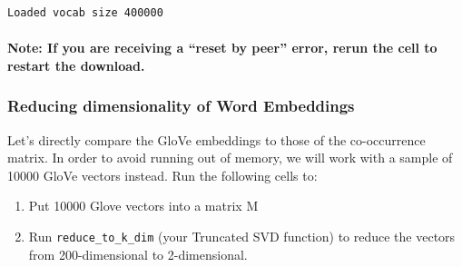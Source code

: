 \documentclass[11pt]{article}
\providecommand{\tightlist}{%
      \setlength{\itemsep}{0pt}\setlength{\parskip}{0pt}}
\begin{document}
    \begin{Verbatim}[commandchars=\\\{\}]
Loaded vocab size 400000
    \end{Verbatim}

    \hypertarget{note-if-you-are-receiving-a-reset-by-peer-error-rerun-the-cell-to-restart-the-download.}{%
\paragraph{Note: If you are receiving a ``reset by peer'' error, rerun
the cell to restart the
download.}\label{note-if-you-are-receiving-a-reset-by-peer-error-rerun-the-cell-to-restart-the-download.}}

    \hypertarget{reducing-dimensionality-of-word-embeddings}{%
\subsubsection{Reducing dimensionality of Word
Embeddings}\label{reducing-dimensionality-of-word-embeddings}}

Let's directly compare the GloVe embeddings to those of the
co-occurrence matrix. In order to avoid running out of memory, we will
work with a sample of 10000 GloVe vectors instead. Run the following
cells to:

\begin{enumerate}
\def\labelenumi{\arabic{enumi}.}
\tightlist
\item
  Put 10000 Glove vectors into a matrix M
\item
  Run \texttt{reduce\_to\_k\_dim} (your Truncated SVD function) to
  reduce the vectors from 200-dimensional to 2-dimensional.
\end{enumerate}
\end{document}
